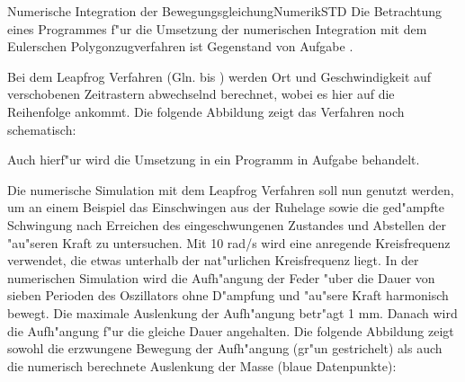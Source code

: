 \begin{MXContent}{Numerische Integration der Bewegungsgleichung}{Numerik}{STD}
Die Betrachtung eines Programmes f"ur die Umsetzung der numerischen Integration mit dem Eulerschen Polygonzugverfahren ist Gegenstand von Aufgabe 
.

Bei dem Leapfrog Verfahren (Gln.  bis ) werden Ort und Geschwindigkeit auf verschobenen Zeitrastern abwechselnd berechnet, wobei es hier auf die Reihenfolge ankommt. Die folgende Abbildung zeigt das Verfahren noch schematisch:
\begin{center}
  \end{center}

Auch hierf"ur wird die Umsetzung in ein Programm in Aufgabe 
behandelt.

Die numerische Simulation mit dem Leapfrog Verfahren soll nun genutzt werden, um an einem Beispiel das Einschwingen aus der Ruhelage sowie die ged"ampfte Schwingung nach Erreichen des eingeschwungenen Zustandes und Abstellen der "au"seren Kraft zu untersuchen. Mit 10 rad/s wird eine anregende Kreisfrequenz verwendet, die etwas unterhalb der nat"urlichen Kreisfrequenz liegt. In der numerischen Simulation wird die Aufh"angung der Feder "uber die Dauer von sieben Perioden des Oszillators ohne D"ampfung und "au"sere Kraft harmonisch bewegt. Die maximale Auslenkung der Aufh"angung betr"agt 1 mm. Danach wird die Aufh"angung f"ur die gleiche Dauer angehalten. Die folgende Abbildung zeigt sowohl die erzwungene Bewegung der Aufh"angung (gr"un gestrichelt) als auch die numerisch berechnete Auslenkung der Masse (blaue Datenpunkte):
\begin{center}
  \end{center}


\end{MXContent}
